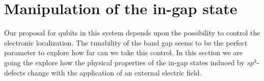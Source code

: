 %   
%   
%   



\section{Manipulation of the in-gap state}
Our proposal for qubits in this system depends upon the possibility to control the electronic localization. The tunability of the band gap seems to be the perfect parameter to explore how far can we take this control.
In this section we are going the explore how the physical properties of the in-gap states induced by $sp^3$-defects change with the application of an external electric field.

